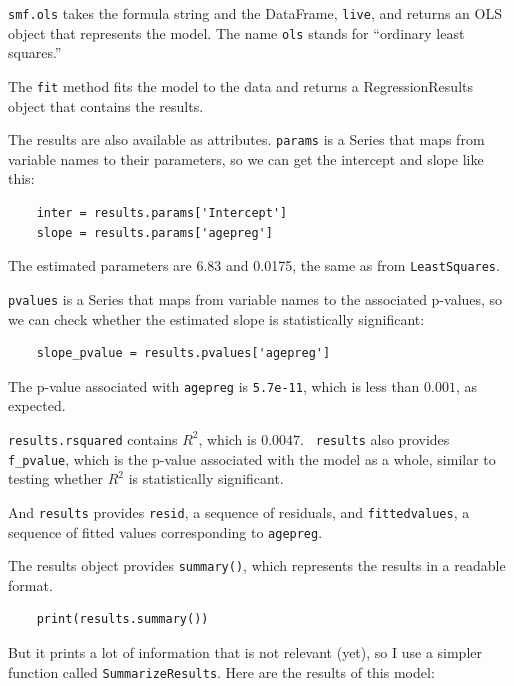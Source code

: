 \documentclass[12pt]{book}
\begin{document}
{\tt smf.ols} takes the formula string and the DataFrame, {\tt live},
and returns an OLS object that represents the model.  The name {\tt ols}
stands for ``ordinary least squares.''

The {\tt fit} method fits the model to the data and returns a
RegressionResults object that contains the results.

The results are also available as attributes.  {\tt params}
is a Series that maps from variable names to their parameters, so we can
get the intercept and slope like this:

\begin{verbatim}
    inter = results.params['Intercept']
    slope = results.params['agepreg']
\end{verbatim}

The estimated parameters are 6.83 and 0.0175, the same as
from {\tt LeastSquares}.

{\tt pvalues} is a Series that maps from variable names to the associated
p-values, so we can check whether the estimated slope is statistically
significant:
   

\begin{verbatim}
    slope_pvalue = results.pvalues['agepreg']
\end{verbatim}

The p-value associated with {\tt agepreg} is {\tt 5.7e-11}, which
is less than $0.001$, as expected.

{\tt results.rsquared} contains $R^2$, which is $0.0047$.  {\tt
  results} also provides \verb"f_pvalue", which is the p-value
associated with the model as a whole, similar to testing whether $R^2$
is statistically significant.

And {\tt results} provides {\tt resid}, a sequence of residuals, and
{\tt fittedvalues}, a sequence of fitted values corresponding to
{\tt agepreg}.

The results object provides {\tt summary()}, which
represents the results in a readable format.  

\begin{verbatim}
    print(results.summary())
\end{verbatim}

But it prints a lot of information that is not relevant (yet), so
I use a simpler function called {\tt SummarizeResults}.  Here are
the results of this model:
\end{document}
